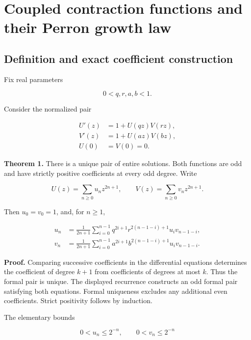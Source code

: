 \hypertarget{v11-coupled_growth_full-coupled-contraction-functions-and-their-perron-growth-law}{%
\section{Coupled contraction functions and their Perron growth
law}\label{v11-coupled_growth_full-coupled-contraction-functions-and-their-perron-growth-law}}

\hypertarget{v11-coupled_growth_full-definition-and-exact-coefficient-construction}{%
\subsection{Definition and exact coefficient
construction}\label{v11-coupled_growth_full-definition-and-exact-coefficient-construction}}

Fix real parameters

\[
0<q,r,a,b<1.
\]

Consider the normalized pair

\[
\boxed{\begin{aligned}
U'(z)&=1+U(qz)V(rz),\\
V'(z)&=1+U(az)V(bz),\\
U(0)&=V(0)=0.
\end{aligned}}
\]

\textbf{Theorem 1.} There is a unique pair of entire solutions. Both
functions are odd and have strictly positive coefficients at every odd
degree. Write

\[
U(z)=\sum_{n\ge0}u_nz^{2n+1},\qquad
V(z)=\sum_{n\ge0}v_nz^{2n+1}.
\]

Then \(u_0=v_0=1\), and, for \(n\ge1\),

\[
\begin{aligned}
u_n&=\frac1{2n+1}\sum_{i=0}^{n-1}
 q^{2i+1}r^{2(n-1-i)+1}u_i v_{n-1-i},\\
v_n&=\frac1{2n+1}\sum_{i=0}^{n-1}
 a^{2i+1}b^{2(n-1-i)+1}u_i v_{n-1-i}.
\end{aligned}
\]

\textbf{Proof.} Comparing successive coefficients in the differential
equations determines the coefficient of degree \(k+1\) from coefficients
of degrees at most \(k\). Thus the formal pair is unique. The displayed
recurrence constructs an odd formal pair satisfying both equations.
Formal uniqueness excludes any additional even coefficients. Strict
positivity follows by induction.

The elementary bounds

\[
0<u_n\le2^{-n},\qquad 0<v_n\le2^{-n}
\]


